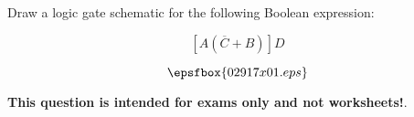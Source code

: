 

Draw a logic gate schematic for the following Boolean expression:

$$\left[ A(\overline{C} + B) \right] D$$







$$\epsfbox{02917x01.eps}$$







{\bf This question is intended for exams only and not worksheets!}.




